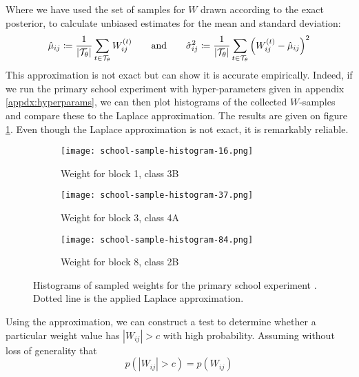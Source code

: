 %
Where we have used the set of samples for $W$ drawn according to the exact posterior, to calculate unbiased estimates for the mean and standard deviation:
%
\begin{equation}
	\hat{\mu}_{ij} \coloneqq \frac{1}{|\mathcal{T}_\theta|} \sum_{t \in \mathcal{T}_\theta} W_{ij}^{(t)} \qquad \textrm{and} \qquad
	\hat{\sigma}_{ij}^2 \coloneqq \frac{1}{|\mathcal{T}_\theta|} \sum_{t \in \mathcal{T}_\theta} \left( W_{ij}^{(t)} - \hat{\mu}_{ij} \right)^2
\end{equation}
%
This approximation is not exact but can show it is accurate empirically. Indeed, if we run the primary school experiment with hyper-parameters given in appendix \ref{appdx:hyperparams}, we can then plot histograms of the collected $W$-samples and compare these to the Laplace approximation. The results are given on figure \ref{fig:school-histogram}. Even though the Laplace approximation is not exact, it is remarkably reliable. 

\begin{figure}[!h]
	\centering
	\begin{subfigure}[t]{0.3\linewidth}
		\centering
		\texttt{[image: school-sample-histogram-16.png]}
		\caption{Weight for block 1, class 3B}
	\end{subfigure}
	\hfill
	\begin{subfigure}[t]{0.3\linewidth}
		\centering
		\texttt{[image: school-sample-histogram-37.png]}
		\caption{Weight for block 3, class 4A}
	\end{subfigure}
	\hfill
	\begin{subfigure}[t]{0.3\linewidth}
		\centering
		\texttt{[image: school-sample-histogram-84.png]}
		\caption{Weight for block 8, class 2B}
	\end{subfigure}

	\caption{Histograms of sampled weights for the primary school experiment \cite{schools}. Dotted line is the applied Laplace approximation.}
	\label{fig:school-histogram}
\end{figure}

Using the approximation, we can construct a test to determine whether a particular weight value has $|W_{ij}| > c$ with high probability. Assuming without loss of generality that
%
\begin{equation}
	p(|W_{ij}| > c) = p(W_{ij})
\end{equation}